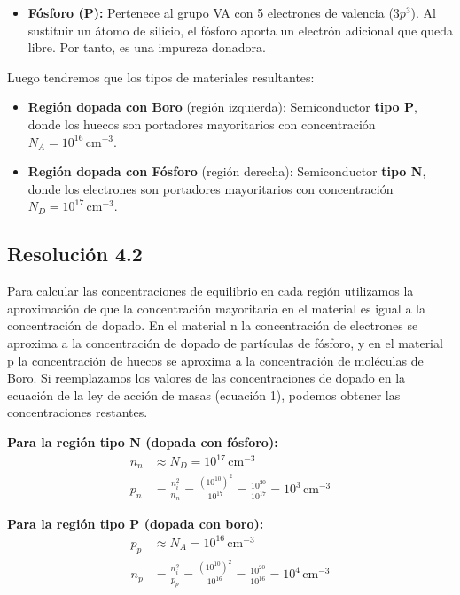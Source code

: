 \documentclass[
  11pt,
  letterpaper,
   addpoints,
   answers
  ]{exam}
\begin{document}
\begin{questions}
\begin{solution}
\begin{itemize}
        \item \textbf{Fósforo (P):} Pertenece al grupo VA con 5 electrones de valencia ($3p^3$). Al sustituir un átomo de silicio, el fósforo aporta un electrón adicional que queda libre. Por tanto, es una impureza donadora.
    \end{itemize}
Luego tendremos que los tipos de materiales resultantes:
    \begin{itemize}
        \item \textbf{Región dopada con Boro} (región izquierda): Semiconductor \textbf{tipo P}, donde los huecos son portadores mayoritarios con concentración $N_A = 10^{16}\,\mathrm{cm^{-3}}$.
        
        \item \textbf{Región dopada con Fósforo} (región derecha): Semiconductor \textbf{tipo N}, donde los electrones son portadores mayoritarios con concentración $N_D = 10^{17}\,\mathrm{cm^{-3}}$.
    \end{itemize}
    \subsection*{Resolución 4.2}
    
    Para calcular las concentraciones de equilibrio en cada región utilizamos la aproximación de que la concentración mayoritaria en el material es igual a la concentración de dopado. En el material n la concentración de electrones se aproxima a la concentración de dopado de partículas de fósforo, y en el material p la concentración de huecos se aproxima a la concentración de moléculas de Boro. Si reemplazamos los valores de las concentraciones de dopado en la ecuación de la ley de acción de masas (ecuación 1), podemos obtener las concentraciones restantes.

    \textbf{Para la región tipo N (dopada con fósforo):}
    \begin{align}
        n_n &\approx N_D = 10^{17}\,\text{cm}^{-3} \\
        p_n &= \frac{n_i^2}{n_n} = \frac{(10^{10})^2}{10^{17}} = \frac{10^{20}}{10^{17}} = 10^3\,\text{cm}^{-3}
    \end{align}

    \textbf{Para la región tipo P (dopada con boro):}
    \begin{align}
        p_p &\approx N_A = 10^{16}\,\text{cm}^{-3} \\
        n_p &= \frac{n_i^2}{p_p} = \frac{(10^{10})^2}{10^{16}} = \frac{10^{20}}{10^{16}} = 10^4\,\text{cm}^{-3}
    \end{align}


\end{solution}
\end{questions}
\end{document}
